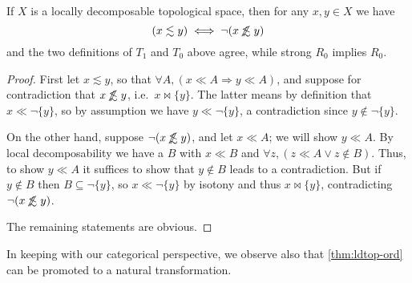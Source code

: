 \documentclass{article}
\def\oapt{\mathrel{\!\not\,\not\lesssim}}
\def\leapx{\lesssim}
\def\cpl#1{\neg #1}
\let\implies\Rightarrow
\def\singleton#1{\{#1\}}
\begin{document}
\begin{thm}\label{thm:ldtop-ord}
  If $X$ is a locally decomposable topological space, then for any $x,y\in X$ we have
  \[ (x\leapx y) \iff \neg(x\oapt y) \]
  and the two definitions of $T_1$ and $T_0$ above agree, while strong $R_0$ implies $R_0$.
\end{thm}
\begin{proof}
  First let $x\leapx y$, so that $\forall A, (x\ll A \implies y\ll A)$, and suppose for contradiction that $x\oapt y$, i.e.\ $x\bowtie \singleton{y}$.
  The latter means by definition that $x\ll \cpl{\singleton{y}}$, so by assumption we have $y\ll \cpl{\singleton{y}}$, a contradiction since $y\notin \cpl{\singleton{y}}$.

  On the other hand, suppose $\neg(x\oapt y)$, and let $x\ll A$; we will show $y\ll A$.
  By local decomposability we have a $B$ with $x\ll B$ and $\forall z, (z\ll A \lor z\notin B)$.
  Thus, to show $y\ll A$ it suffices to show that $y\notin B$ leads to a contradiction.
  But if $y\notin B$ then $B\subseteq \cpl{\singleton{y}}$, so $x\ll \cpl{\singleton{y}}$ by isotony and thus $x\bowtie \singleton{y}$, contradicting $\neg(x\oapt y)$.

  The remaining statements are obvious.
\end{proof}

In keeping with our categorical perspective, we observe also that \cref{thm:ldtop-ord} can be promoted to a natural transformation.
\end{document}
